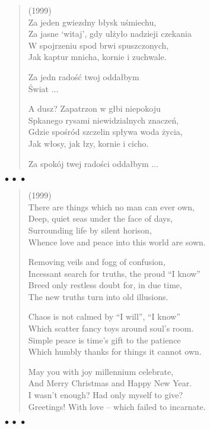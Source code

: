 \documentclass{article} %
\newenvironment{wierszd}[2]
	{\begin{verse} \hspace*{-1em}{\bf #1}\hfill{\small{(#2)}}\\[.5ex] }
	{\end{verse} \begin{center}$\bullet\ \bullet\ \bullet$\end{center}}
\newcommand{\e}{\eob}
\renewcommand{\a}{\aob}
\renewcommand{\o}{\'{o}}
\newcommand{\n}{\'{n}}
\newcommand{\s}{\'{s}}
\renewcommand{\S}{\'{S}}
\begin{document}
\begin{wierszd}{}{1999}
Za jeden gwiezdny b{\l}ysk u{\s}miechu,\\
Za jasne `witaj', gdy ul\.{z}y{\l}o nadzieji czekania\\
W spojrzeniu spod brwi spuszczonych,\\
Jak kaptur mnicha, kornie i zuchwale.

Za jedn{\a} rado{\s}\'c twoj{\a} odda{\l}bym\\
{\S}wiat  ...

A dusz{\e}? Zapatrzon{\a} w g{\l}{\e}bi{\e} niepokoju\\
Sp{\e}kanego rysami niewidzialnych znacze{\n},\\
Gdzie spo{\s}r{\o}d szczelin sp{\l}ywa woda \.{z}ycia,\\
Jak w{\l}osy, jak {\l}zy, kornie i cicho.

Za spok{\o}j twej rado{\s}ci odda{\l}bym ...
\end{wierszd}

\newpage
\begin{wierszd}{}{1999}
There are things which no man can ever own,\\
Deep, quiet seas under the face of days,\\
Surrounding life by silent horison,\\
Whence love and peace into this world are sown.

Removing veils and fogg of confusion,\\
Incessant search for truths, the proud ``I know''\\
Breed only restless doubt for, in due time,\\
The new truths turn into old illusions.

Chaos is not calmed by ``I will'', ``I know''\\
Which scatter fancy toys around soul's room.\\
Simple peace is time's gift to the patience\\
Which humbly thanks for things it cannot own.

May you with joy millennium celebrate,\\
And Merry Christmas and Happy New Year.\\
I wasn't enough? Had only myself to give?\\
Greetings! With love -- which failed to incarnate.
\end{wierszd}
\end{document}
